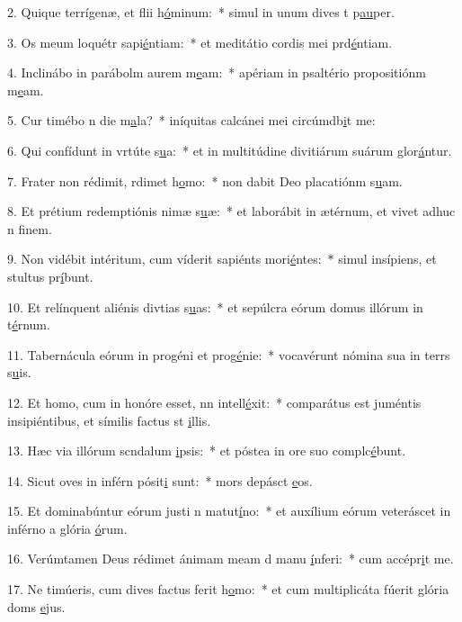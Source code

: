 2. Quique terrígenæ, et flii h\uline{ó}minum:~* simul in unum dives t p\uline{au}per.\par 
3. Os meum loquétr sapi\uline{é}ntiam:~* et meditátio cordis mei prd\uline{é}ntiam.\par 
4. Inclinábo in parábolm aurem m\uline{e}am:~* apériam in psaltério propositiónm m\uline{e}am.\par 
5. Cur timébo n die m\uline{a}la?~* iníquitas calcánei mei circúmdb\uline{i}t me:\par 
6. Qui confídunt in vrtúte s\uline{u}a:~* et in multitúdine divitiárum suárum glor\uline{á}ntur.\par 
7. Frater non rédimit, rdimet h\uline{o}mo:~* non dabit Deo placatiónm s\uline{u}am.\par 
8. Et prétium redemptiónis nimæ s\uline{u}æ:~* et laborábit in ætérnum, et vivet adhuc n f\uline{i}nem.\par 
9. Non vidébit intéritum, cum víderit sapiénts mori\uline{é}ntes:~* simul insípiens, et stultus pr\uline{í}bunt.\par 
10. Et relínquent aliénis divtias s\uline{u}as:~* et sepúlcra eórum domus illórum in t\uline{é}rnum.\par 
11. Tabernácula eórum in progéni et prog\uline{é}nie:~* vocavérunt nómina sua in terrs s\uline{u}is.\par 
12. Et homo, cum in honóre esset, nn intell\uline{é}xit:~* comparátus est juméntis insipiéntibus, et símilis factus st \uline{i}llis.\par 
13. Hæc via illórum scndalum \uline{i}psis:~* et póstea in ore suo complc\uline{é}bunt.\par 
14. Sicut oves in inférn pósit\uline{i} sunt:~* mors depásct \uline{e}os.\par 
15. Et dominabúntur eórum justi n matut\uline{í}no:~* et auxílium eórum veteráscet in inférno a glória \uline{ó}rum.\par 
16. Verúmtamen Deus rédimet ánimam meam d manu \uline{í}nferi:~* cum accépr\uline{i}t me.\par 
17. Ne timúeris, cum dives factus ferit h\uline{o}mo:~* et cum multiplicáta fúerit glória doms \uline{e}jus.\par 
